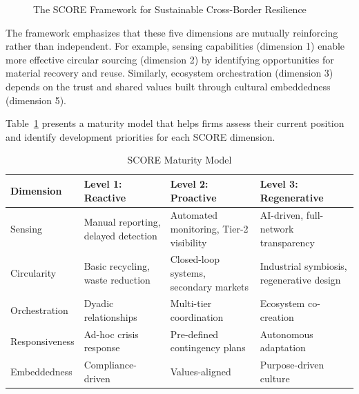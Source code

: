 \documentclass[12pt,a4paper,twoside]{article}
\begin{document}
\begin{figure}[htbp]
\centering
{}
\caption{The SCORE Framework for Sustainable Cross-Border Resilience}
\label{fig:framework}
\end{figure}

The framework emphasizes that these five dimensions are mutually reinforcing
rather than independent.  For example, sensing capabilities (dimension 1)
enable more effective circular sourcing (dimension 2) by identifying
opportunities for material recovery and reuse.  Similarly, ecosystem
orchestration (dimension 3) depends on the trust and shared values built through
cultural embeddedness (dimension 5).

Table~\ref{tab:maturity} presents a maturity model that helps firms assess their
current position and identify development priorities for each SCORE dimension.

\begin{table}[htbp]
\centering
\caption{SCORE Maturity Model}
\label{tab:maturity}
\begin{tabular}{@{}p{2cm}p{3.5cm}p{3.5cm}p{3.5cm}@{}}
\toprule
\textbf{Dimension} & \textbf{Level 1: Reactive} & \textbf{Level 2: Proactive} & \textbf{Level 3: Regenerative} \\
\midrule
Sensing & Manual reporting, delayed detection & Automated monitoring, Tier-2 visibility & AI-driven, full-network transparency \\
Circularity & Basic recycling, waste reduction & Closed-loop systems, secondary markets & Industrial symbiosis, regenerative design \\
Orchestration & Dyadic relationships & Multi-tier coordination & Ecosystem co-creation \\
Responsiveness & Ad-hoc crisis response & Pre-defined contingency plans & Autonomous adaptation \\
Embeddedness & Compliance-driven & Values-aligned & Purpose-driven culture \\
\bottomrule
\end{tabular}
\end{table}
\end{document}
